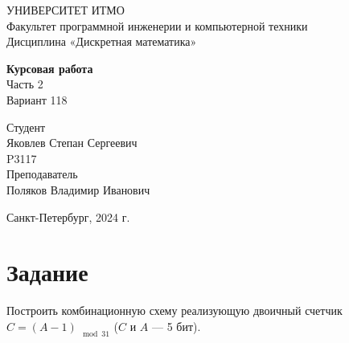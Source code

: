 \documentclass{article}
\begin{document}
\begin{center}
    УНИВЕРСИТЕТ ИТМО \\
    Факультет программной инженерии и компьютерной техники \\
    Дисциплина «Дискретная математика»
    
    \vspace{5cm}

    \large
    \textbf{Курсовая работа} \\
    Часть 2 \\
    Вариант 118
\end{center}

\vspace{2cm}

\hfill\begin{minipage}{0.45\linewidth}
Студент \\
Яковлев Степан Сергеевич \\
P3117 \\

Преподаватель \\
Поляков Владимир Иванович
\end{minipage}

\vfill

\begin{center}
    Санкт-Петербург, 2024 г.
\end{center}

\thispagestyle{empty}
\newpage

\section*{Задание}
Построить комбинационную схему реализующую двоичный счетчик $C = (A - 1)_{\mod 31}$ ($C$ и $A$ --- 5 бит).
\end{document}
